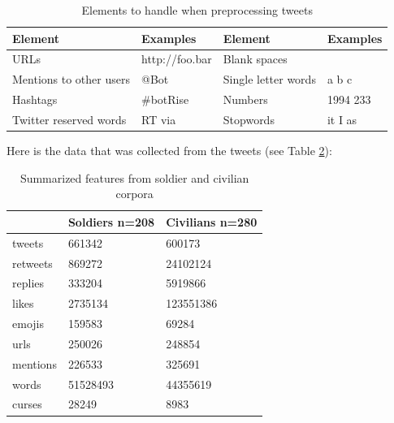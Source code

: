 \begin{table}[h]
  \caption{Elements to handle when preprocessing tweets}
  \label{table:elementsRemoved}
  \centering
  \renewcommand{\tabularxcolumn}{m} %
  \begin{tabularx}{0.8\textwidth}{l  l || l  l}
    \toprule
    \textbf{Element} & \textbf{Examples} & \textbf{Element}    & \textbf{Examples}
    \tabularnewline \midrule
    URLs
                     &
    http://foo.bar   & Blank spaces      &
    \tabularnewline \hline
    Mentions to other users
                     & @Bot              & Single letter words & a b c
    \tabularnewline \hline
    Hashtags
                     & \#botRise         & Numbers             & 1994 233
    \tabularnewline \hline
    Twitter reserved words
                     & RT via            & Stopwords
                     & it I as
    \tabularnewline \bottomrule
  \end{tabularx}
\end{table}

Here is the data that was collected from the tweets (see Table \ref{table:summarized}):

\begin{table}[h]
  \caption{Summarized features from soldier and civilian corpora}
  \label{table:summarized}
  \centering
  \renewcommand{\tabularxcolumn}{m} %
  \begin{tabularx}{0.5\textwidth}{l | l | l}
    \toprule
             & Soldiers n=208 & Civilians n=280
    \tabularnewline \hline
    tweets   & 661342         & 600173
    \tabularnewline \hline
    retweets & 869272         & 24102124
    \tabularnewline \hline
    replies  & 333204         & 5919866
    \tabularnewline \hline
    likes    & 2735134        & 123551386
    \tabularnewline \hline
    emojis   & 159583         & 69284
    \tabularnewline \hline
    urls     & 250026         & 248854
    \tabularnewline \hline
    mentions & 226533         & 325691
    \tabularnewline \hline
    words    & 51528493       & 44355619
    \tabularnewline \hline
    curses   & 28249          & 8983
    \tabularnewline \bottomrule
  \end{tabularx}
\end{table}


